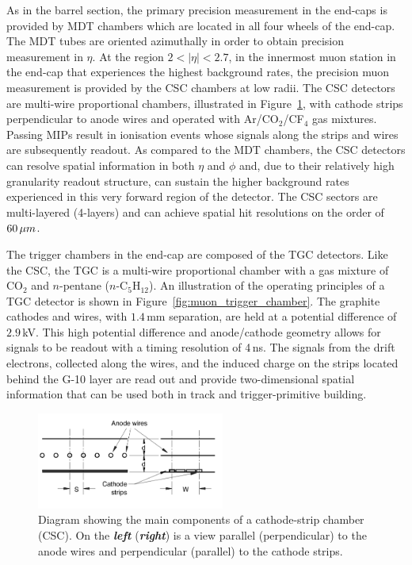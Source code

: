 As in the barrel section, the primary precision measurement in the end-caps is provided
by MDT chambers which are located in all four wheels of the end-cap.
The MDT tubes are oriented azimuthally in order to obtain precision measurement in $\eta$.
At the region $2 < \lvert \eta \rvert < 2.7$, in the innermost muon station
in the end-cap that experiences the highest background rates,
the precision muon measurement is provided by the CSC chambers at low radii.
The CSC detectors are multi-wire proportional chambers, illustrated in Figure~\ref{fig:csc_chamber},
with cathode strips perpendicular to anode wires and operated with Ar/CO$_2$/CF$_4$ gas mixtures.
Passing MIPs result in ionisation events whose signals along the strips and wires are
subsequently readout.
As compared to the MDT chambers, the CSC detectors can resolve spatial information in both $\eta$ and $\phi$
and, due to their relatively high granularity readout structure, can sustain the higher
background rates experienced in this very forward region of the detector.
The CSC sectors are multi-layered (4-layers) and can achieve spatial hit resolutions on the order
of $60\,\mu m$.

The trigger chambers in the end-cap are composed of the TGC detectors.
Like the CSC, the TGC is a multi-wire proportional chamber with a gas mixture
of CO$_2$ and $n$-pentane ($n$-C$_5$H$_{12}$).
An illustration of the operating principles of a TGC detector is shown in Figure~\ref{fig:muon_trigger_chamber}.
The graphite cathodes and wires, with $1.4$\,mm separation, are held at a potential
difference of $2.9$\,kV.
This high potential difference and anode/cathode geometry allows for signals to be readout
with a timing resolution of 4\,ns.
The signals from the drift electrons, collected along the wires, and the induced
charge on the strips located behind the G-10 layer are read out and provide
two-dimensional spatial information that can be used both in track and trigger-primitive building.


\begin{figure}[!htb]
    \begin{center}
        \includegraphics[width=0.55\textwidth]{figures/chapter2/muon_spec/csc_chamber}
        \caption{
            Diagram showing the main components of a cathode-strip chamber (CSC).
            On the \textbf{\textit{left}} (\textbf{\textit{right}}) is a view parallel (perpendicular) to the anode
            wires and perpendicular (parallel) to the cathode strips.
        }
        \label{fig:csc_chamber}
    \end{center}
\end{figure}

